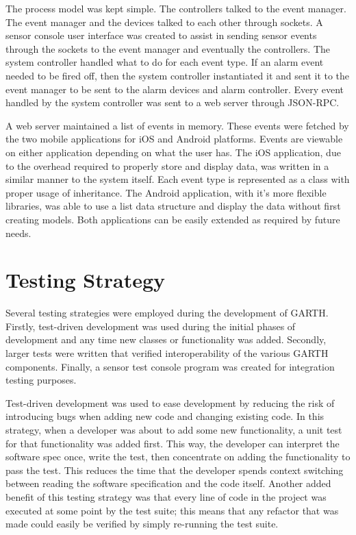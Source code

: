 \documentclass{article}
\begin{document}
The process model was kept simple. The controllers talked to the event manager.
The event manager and the devices talked to each other through sockets. A
sensor console user interface was created to assist in sending sensor events
through the sockets to the event manager and eventually the controllers. The
system controller handled what to do for each event type. If an alarm event
needed to be fired off, then the system controller instantiated it and sent it
to the event manager to be sent to the alarm devices and alarm controller.
Every event handled by the system controller was sent to a web server through
JSON-RPC. 

A web server maintained a list of events in memory. These events were fetched
by the two mobile applications for iOS and Android platforms. Events are
viewable on either application depending on what the user has. The iOS
application, due to the overhead required to properly store and display data,
was written in a similar manner to the system itself. Each event type is
represented as a class with proper usage of inheritance. The Android
application, with it's more flexible libraries, was able to use a list data
structure and display the data without first creating models. Both applications
can be easily extended as required by future needs.

\section{Testing Strategy} %

Several testing strategies were employed during the development of
GARTH. Firstly, test-driven development was used during the initial
phases of development and any time new classes or functionality was
added. Secondly, larger tests were written that verified
interoperability of the various GARTH components. Finally, a sensor
test console program was created for integration testing purposes.

Test-driven development was used to ease development by reducing the
risk of introducing bugs when adding new code and changing existing
code. In this strategy, when a developer was about to add some new
functionality, a unit test for that functionality was added
first. This way, the developer can interpret the software spec once,
write the test, then concentrate on adding the functionality to pass
the test. This reduces the time that the developer spends context
switching between reading the software specification and the code
itself. Another added benefit of this testing strategy was that every
line of code in the project was executed at some point by the test
suite; this means that any refactor that was made could easily be
verified by simply re-running the test suite.
\end{document}
